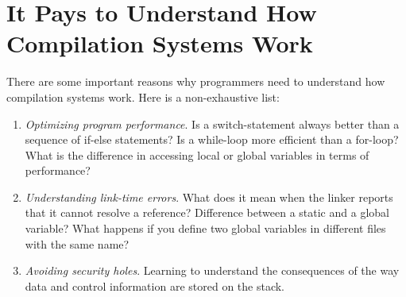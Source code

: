 \section{It Pays to Understand How Compilation Systems Work}

There are some important reasons why programmers need to understand how compilation
systems work. Here is a non-exhaustive list: 

\begin{enumerate}
  \item \textit{Optimizing program performance}. Is a switch-statement always
    better than a sequence of if-else statements? Is a while-loop more
    efficient than a for-loop? What is the difference in accessing local or
    global variables in terms of performance?

  \item \textit{Understanding link-time errors}. What does it mean when the
    linker reports that it cannot resolve a reference? Difference between a
    static and a global variable?  What happens if you define two global
    variables in different files with the same name?

  \item \textit{Avoiding security holes}. Learning to understand the
    consequences of the way data and control information are stored on the
    stack.

\end{enumerate}
